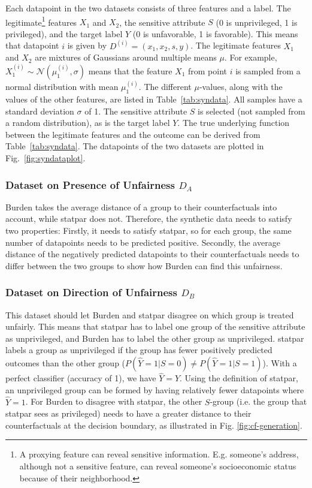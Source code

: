 \documentclass[runningheads]{llncs}
\begin{document}
Each datapoint in the two datasets consists of three features and a label. The \gls{legitimate}\footnote{A proxying feature can reveal sensitive information. E.g. someone's address, although not a sensitive feature, can reveal someone's socioeconomic status because of their neighborhood.} features $X_1$ and 
$X_2$, the sensitive attribute $S$ (0 is unprivileged, 1 is privileged), and the target label $Y$ (0 is unfavorable, 1 is favorable). This means that datapoint $i$ is given by 
$ D^{(i)} = (x_1, x_2, s, y)$. The \gls{legitimate} features $X_1$ and $X_2$ are mixtures of Gaussians around multiple means $\mu$. For example, $X_1^{(i)} \sim \mathcal{N}(\mu_1^{(i)}, \sigma)$ means that the feature $X_1$ from point $i$ is sampled from a normal distribution with mean $\mu_1^{(i)}$. The different $\mu$-values, along with the values of the other features, are listed in Table~\ref{tab:syndata}. All samples have a standard deviation $\sigma$ of 1. The sensitive attribute $S$ is selected (not sampled from a random distribution), as is the target label $Y$. The true underlying function between the legitimate features and the outcome can be derived from Table~\ref{tab:syndata}. The datapoints of the two datasets are plotted in Fig.~\ref{fig:syndataplot}.

\subsubsection{Dataset on Presence of Unfairness $D_A$}
\gls{Burden} takes the average distance of a group to their counterfactuals into account, while \gls{statpar} does not. 
Therefore, the synthetic data needs to satisfy two properties: Firstly, it needs to satisfy \gls{statpar}, so for each group, the same number of datapoints needs to be predicted positive.
Secondly, the average distance of the negatively predicted datapoints to their counterfactuals needs to differ between the two groups to show how \gls{Burden} can find this unfairness.

\subsubsection{Dataset on Direction of Unfairness $D_B$}
This dataset should let \gls{Burden} and \gls{statpar} disagree on which group is treated unfairly. This means that \gls{statpar} has to label one group of the sensitive attribute as unprivileged, and \gls{Burden} has to label the other group as unprivileged. \Gls{statpar} labels a group as unprivileged if the group has fewer  positively predicted outcomes than the other group ($P(\hat{Y}=1|S=0) \neq P(\hat{Y}=1|S=1)$). With a perfect classifier (accuracy of 1), we have $\hat{Y} = Y$.
Using the definition of \gls{statpar}, an unprivileged group can be formed by having relatively fewer datapoints where $\hat{Y}=1$. For \gls{Burden} to disagree with \gls{statpar}, the other $S$-group (i.e. the group that \gls{statpar} sees as privileged) needs to have a greater distance to their counterfactuals at the decision boundary, as illustrated in Fig. \ref{fig:cf-generation}.
\end{document}
